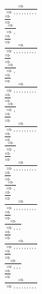 \documentclass[11pt]{article}
\begin{document}
\begin{center}
\bigskip
\\$\frac{\Rightarrow }{\Rightarrow , , , , , , , , , }$
\bigskip
\\$\frac{\Rightarrow }{\Rightarrow }$
\bigskip
\\$\frac{\Rightarrow }{\Rightarrow , }$
\bigskip
\\$\frac{\Rightarrow }{\Rightarrow }$
\bigskip
\\$\frac{\Rightarrow }{\Rightarrow , , , , , , , , , }$
\bigskip
\\$\frac{\Rightarrow }{\Rightarrow }$
\bigskip
\\$\frac{\Rightarrow }{\Rightarrow , }$
\bigskip
\\$\frac{\Rightarrow }{\Rightarrow }$
\bigskip
\\$\frac{\Rightarrow }{\Rightarrow , , , , , , , , , }$
\bigskip
\\$\frac{\Rightarrow }{\Rightarrow }$
\bigskip
\\$\frac{\Rightarrow }{\Rightarrow , }$
\bigskip
\\$\frac{\Rightarrow }{\Rightarrow }$
\bigskip
\\$\frac{\Rightarrow }{\Rightarrow , , , , , , , , , }$
\bigskip
\\$\frac{\Rightarrow }{\Rightarrow }$
\bigskip
\\$\frac{\Rightarrow }{\Rightarrow , }$
\bigskip
\\$\frac{\Rightarrow }{\Rightarrow }$
\bigskip
\\$\frac{\Rightarrow }{\Rightarrow , , , , , , , , , }$
\bigskip
\\$\frac{\Rightarrow }{\Rightarrow }$
\bigskip
\\$\frac{\Rightarrow }{\Rightarrow , }$
\bigskip
\\$\frac{\Rightarrow }{\Rightarrow }$
\bigskip
\\$\frac{\Rightarrow }{\Rightarrow , , , , , , , , , }$
\bigskip
\\$\frac{\Rightarrow }{\Rightarrow }$
\bigskip
\\$\frac{\Rightarrow }{\Rightarrow , , , }$
\bigskip
\\$\frac{\Rightarrow }{\Rightarrow }$
\bigskip
\\$\frac{\Rightarrow }{\Rightarrow , , , , , , , , , }$
\bigskip
\\$\frac{\Rightarrow }{\Rightarrow }$
\bigskip
\\$\frac{\Rightarrow }{\Rightarrow , , , }$
\bigskip
\\$\frac{\Rightarrow }{\Rightarrow }$
\bigskip
\\$\frac{\Rightarrow }{\Rightarrow , , , , , , , , , }$

\end{center}
\end{document}
